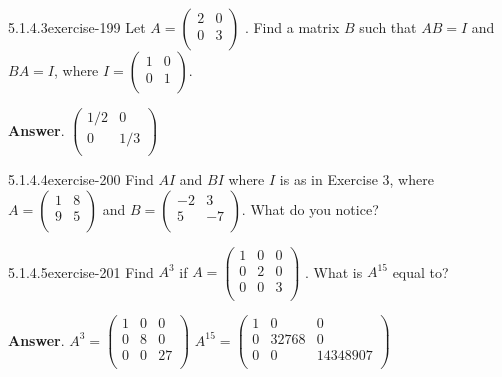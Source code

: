 \documentclass[twoside,10pt,]{book}
\numberwithin{equation}{section}
\begin{document}
\begin{divisionsolution}{5.1.4.3}{}{exercise-199}%
\hypertarget{p-1765}{}%
Let \(A =\left(
\begin{array}{cc}
2 & 0 \\
0 & 3 \\
\end{array}
\right)\) . Find a matrix \(B\) such that \(A B = I\) and \(B A = I\), where \(I = \left(
\begin{array}{cc}
1 & 0 \\
0 & 1 \\
\end{array}
\right)\).%
\par\smallskip%
\noindent\textbf{Answer}.\quad%
\hypertarget{p-1766}{}%
\(\left(
\begin{array}{cc}
1/2 & 0 \\
0 & 1/3 \\
\end{array}
\right)\)%
\end{divisionsolution}%
\begin{divisionsolution}{5.1.4.4}{}{exercise-200}%
\hypertarget{p-1767}{}%
Find \(A I\) and \(B I\) where \(I\) is as in Exercise 3, where \(A = \left(
\begin{array}{cc}
1 & 8 \\
9 & 5 \\
\end{array}
\right)\) and \(B = \left(
\begin{array}{cc}
-2 & 3 \\
5 & -7 \\
\end{array}
\right)\). What do you notice?%
\end{divisionsolution}%
\begin{divisionsolution}{5.1.4.5}{}{exercise-201}%
\hypertarget{p-1768}{}%
Find \(A^3\) if \(A=\left(
\begin{array}{ccc}
1 & 0 & 0 \\
0 & 2 & 0 \\
0 & 0 & 3 \\
\end{array}
\right)\) . What is \(A^{15}\) equal to?%
\par\smallskip%
\noindent\textbf{Answer}.\quad%
\hypertarget{p-1769}{}%
\(A^3=\left(
\begin{array}{ccc}
1 & 0 & 0 \\
0 & 8 & 0 \\
0 & 0 & 27 \\
\end{array}
\right)\)  \(A^{15}=\left(
\begin{array}{ccc}
1 & 0 & 0 \\
0 & 32768 & 0 \\
0 & 0 & 14348907 \\
\end{array}
\right)\)%
\end{divisionsolution}%
\end{document}
